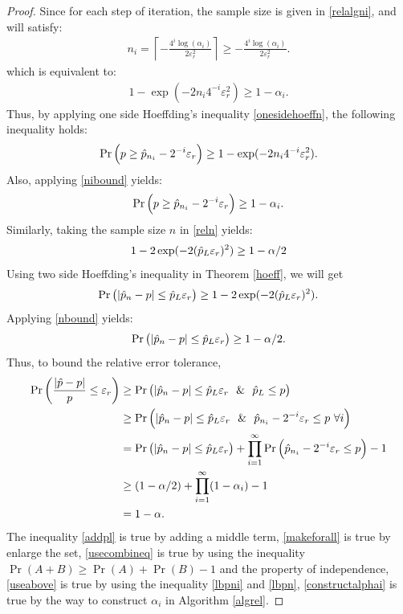\documentclass{iitthesis}
\begin{document}
\begin{proof}
Since for each step of iteration, the sample size is given in \eqref{relalgni}, and will satisfy:
\begin{align*}
n_i = \left \lceil -\frac{4^i \log(\alpha_i)} {2\varepsilon_r^2 } \right\rceil \geq -\frac{4^i \log(\alpha_i)} {2\varepsilon_r^2 }.
 \end{align*}
 which is equivalent to:
\begin{align}\label{nibound}
1- \exp(-2n_i4^{-i}\varepsilon_r^2) \geq 1-\alpha_i.
\end{align}
 Thus, by applying one side Hoeffding's inequality \eqref{onesidehoeffn}, the following inequality holds:
 \begin{align*} 
\Pr\left(p \geq \hat{p}_{n_i}-2^{-i}\varepsilon_r  \right) \geq 1- \exp(-2n_i4^{-i}\varepsilon_r^2).
 \end{align*} 
Also, applying \eqref{nibound} yields:
 \begin{align} \label{lbpni}
 \Pr\left(p \geq \hat{p}_{n_i}-2^{-i}\varepsilon_r \right) \geq 1-\alpha_i.
 \end{align}
Similarly, taking the sample size $n$ in \eqref{reln} yields:
\begin{align}\label{nbound}
1-2\exp(-2  (\hat{p}_L\varepsilon_{r})^2) \geq 1-\alpha/2
\end{align}
 Using two side Hoeffding's inequality in Theorem \ref{hoeff}, we will get
\begin{align}
 \Pr \left( \left|{\hat{p}_n - p}\right| \leq \hat{p}_L \varepsilon_r \right ) \geq  1-2\exp(-2  (\hat{p}_L\varepsilon_{r})^2).
 \end{align}
 Applying \eqref{nbound} yields:
 \begin{align}\label{lbpn}
  \Pr \left( \left|{\hat{p}_n - p}\right| \leq \hat{p}_L \varepsilon_r \right ) \geq 1-\alpha/2.
 \end{align}
 Thus, to bound the relative error tolerance,
\begin{align}
 \Pr \left ( \frac{\abs{\hp - p}}{p} \leq \varepsilon_r\right ) & \geq \Pr \left ( \abs{\hp_n - p} \leq \hp_L\varepsilon_r \ \ \& \ \   \hp_L \leq p \right ) \label{addpl}\\&
 \geq \Pr \left( \abs{\hp_n - p} \leq \hp_L \varepsilon_r \ \  \& \ \  \hp_{n_i} - 2^{-i}\varepsilon_r \leq p\  \forall i   \right) \label{makeforall}\\&
  = \Pr\left ( \abs{\hp_n - p} \leq \hp_L \varepsilon_r \right)+ \prod_{i = 1}^\infty \Pr \left(\hp_{n_i} - 2^{-i}\varepsilon_r  \leq p \right)-1\label{usecombineq} \\&
\geq (1-\alpha/2)+\prod_{i=1}^\infty(1-\alpha_i)-1 \label{useabove} \\&
 = 1-\alpha \label{constructalphai}.
\end{align}
The inequality \eqref{addpl} is true by adding a middle term, \eqref{makeforall} is true by enlarge the set, \eqref{usecombineq} is true by using the inequality $\Pr(A+B)\geq\Pr(A)+\Pr(B)-1$ and the property of independence, \eqref{useabove} is true by using the inequality \eqref{lbpni} and \eqref{lbpn}, \eqref{constructalphai} is true by the way to construct $\alpha_i$ in Algorithm \ref{algrel}.
\end{proof}
\end{document}
